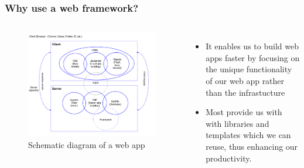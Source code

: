 \documentclass[10pt,t,xcolor=dvipsnames]{beamer}
\begin{document}
\begin{frame}[fragile]
\frametitle{Why use a web framework?}
\pause
\begin{columns}[l]
\vspace{-1cm}
\begin{figure}
\centering
\includegraphics[scale=0.125]{../images/webapp_building_blocks.png}
\caption{\footnotesize{Schematic diagram of a web app}}
\end{figure}
\begin{itemize}[<+->]
\item It enables us to build web apps faster by focusing on the unique functionality of our web app rather than the infrastucture
\item Most provide us with with libraries and templates which we can reuse, thus enhancing our productivity.
\end{itemize}
\end{columns}
\end{frame}
\end{document}
